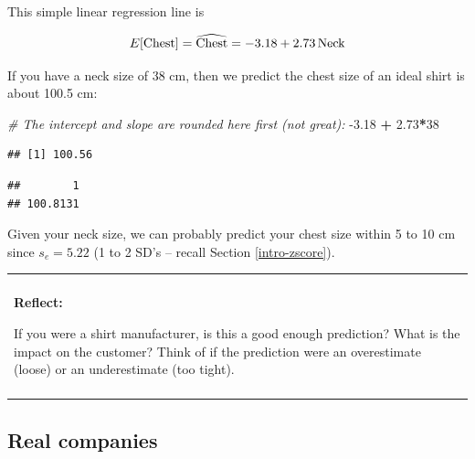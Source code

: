 \documentclass[]{book}
\newenvironment{Shaded}{\begin{snugshade}}{\end{snugshade}}
\newcommand{\CommentTok}[1]{\textcolor[rgb]{0.56,0.35,0.01}{\textit{#1}}}
\newcommand{\DataTypeTok}[1]{\textcolor[rgb]{0.13,0.29,0.53}{#1}}
\newcommand{\DecValTok}[1]{\textcolor[rgb]{0.00,0.00,0.81}{#1}}
\newcommand{\FloatTok}[1]{\textcolor[rgb]{0.00,0.00,0.81}{#1}}
\newcommand{\KeywordTok}[1]{\textcolor[rgb]{0.13,0.29,0.53}{\textbf{#1}}}
\newcommand{\NormalTok}[1]{#1}
\newcommand{\OperatorTok}[1]{\textcolor[rgb]{0.81,0.36,0.00}{\textbf{#1}}}
\newcommand{\StringTok}[1]{\textcolor[rgb]{0.31,0.60,0.02}{#1}}
\newenvironment{reflect}
{
    \begin{center}
    
    \begin{tabular}{|p{0.8\textwidth}|}
    \rowcolor{LightBlue}
    \hline\\
    \rowcolor{LightBlue}
    \textbf{Reflect:}
}
{
    \\\rowcolor{LightBlue}
    \\\hline
    \end{tabular} 
    \end{center}
}
\begin{document}
This simple linear regression line is

\[ E[\hbox{Chest}] = \widehat{\hbox{Chest}} = -3.18 + 2.73\,\hbox{Neck}\]

If you have a neck size of 38 cm, then we predict the chest size of an ideal shirt is about 100.5 cm:

\begin{Shaded}
\begin{Highlighting}[]
\CommentTok{# The intercept and slope are rounded here first (not great):}
\FloatTok{-3.18} \OperatorTok{+}\StringTok{ }\FloatTok{2.73}\OperatorTok{*}\DecValTok{38}
\end{Highlighting}
\end{Shaded}

\begin{verbatim}
## [1] 100.56
\end{verbatim}

\begin{Shaded}
\end{Shaded}

\begin{verbatim}
##        1 
## 100.8131
\end{verbatim}

Given your neck size, we can probably predict your chest size within 5 to 10 cm since \(s_e = 5.22\) (1 to 2 SD's -- recall Section \ref{intro-zscore}).

\begin{reflect}
If you were a shirt manufacturer, is this a good enough prediction? What
is the impact on the customer? Think of if the prediction were an
overestimate (loose) or an underestimate (too tight).
\end{reflect}

\hypertarget{real-companies}{%
\subsection{Real companies}\label{real-companies}}
\end{document}
